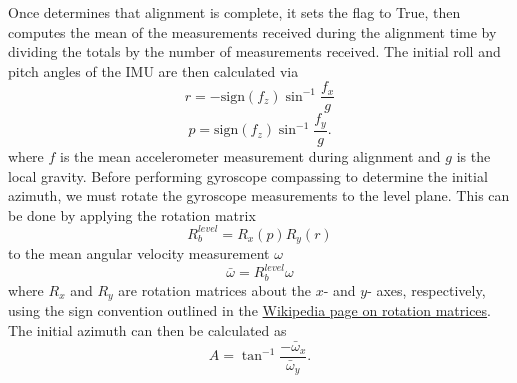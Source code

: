 \documentclass[11pt, oneside]{article}   	%
\begin{document}
Once  determines that alignment is complete, it sets the  flag to True, then computes the mean of the measurements received during the alignment time by dividing the totals by the number of measurements received.  The initial roll and pitch angles of the IMU are then calculated via
\begin{equation}
r=-\textrm{sign}(f_z)\sin^{-1}\frac{f_x}{g}
\end{equation}
\begin{equation}
p=\textrm{sign}(f_z)\sin^{-1}\frac{f_y}{g}.
\end{equation}
where $f$ is the mean accelerometer measurement during alignment and $g$ is the local gravity.  Before performing gyroscope compassing to determine the initial azimuth, we must rotate the gyroscope measurements to the level plane.  This can be done by applying the rotation matrix
\begin{equation}
R_b^{level}=R_x(p)R_y(r)
\end{equation}
to the mean angular velocity measurement $\omega$
\begin{equation}
\bar \omega=R_b^{level}\omega
\end{equation}
where $R_x$ and $R_y$ are rotation matrices about the $x$- and $y$- axes, respectively, using the sign convention outlined in the \href{https://en.wikipedia.org/wiki/Rotation_matrix}{Wikipedia page on rotation matrices}. 
The initial azimuth can then be calculated as 
\begin{equation}
A=\tan^{-1}\frac{-\bar\omega_x}{\bar\omega_y}.
\end{equation}
\end{document}
